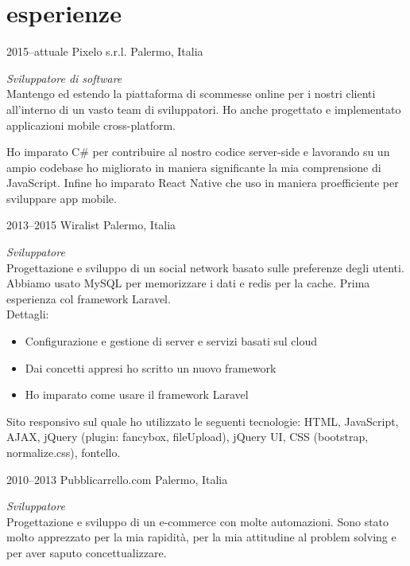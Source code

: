 \documentclass[]{friggeri-cv} %
\begin{document}
\section{esperienze}
\begin{entrylist}
\entry
{2015--attuale}
{Pixelo s.r.l.}
{Palermo, Italia}
{\emph{Sviluppatore di software} \\
Mantengo ed estendo la piattaforma di scommesse online per i nostri clienti
all'interno di un vasto team di sviluppatori. Ho anche progettato e
implementato applicazioni mobile cross-platform.

Ho imparato C\# per contribuire al nostro codice server-side e lavorando su un
ampio codebase ho migliorato in maniera significante la mia comprensione di
JavaScript. Infine ho imparato React Native che uso in maniera proefficiente
per sviluppare app mobile.
}
\entry
{2013--2015}
{Wiralist}
{Palermo, Italia}
{\emph{Sviluppatore} \\
Progettazione e sviluppo di un social network basato sulle preferenze degli utenti. Abbiamo usato MySQL per memorizzare i dati e redis per la cache. Prima esperienza col framework Laravel. \\
Dettagli:
\begin{itemize}
\item Configurazione e gestione di server e servizi basati sul cloud
\item Dai concetti appresi ho scritto un nuovo framework
\item Ho imparato come usare il framework Laravel
\end{itemize}

Sito responsivo sul quale ho utilizzato le seguenti tecnologie: HTML,
JavaScript, AJAX, jQuery (plugin: fancybox, fileUpload), jQuery UI,
CSS (bootstrap, normalize.css), fontello.
}
\entry
{2010--2013}
{Pubblicarrello.com}
{Palermo, Italia}
{\emph{Sviluppatore} \\
Progettazione e sviluppo di un e-commerce con molte automazioni. Sono stato molto
apprezzato per la mia rapidità, per la mia attitudine al problem solving e per
aver saputo concettualizzare.

}
\end{entrylist}
\end{document}
